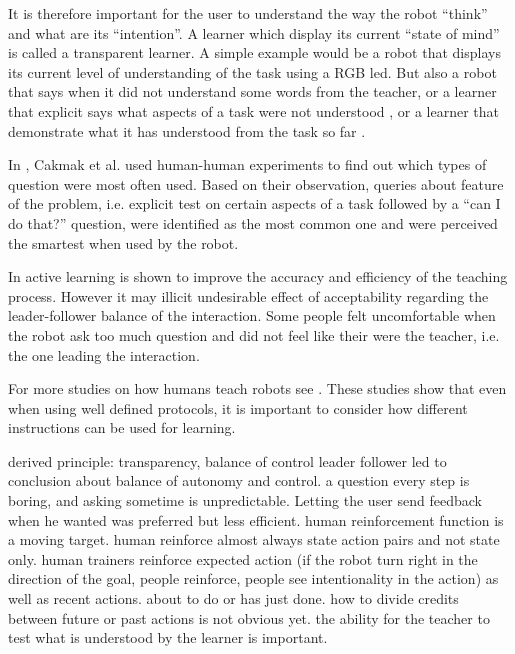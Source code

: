 It is therefore important for the user to understand the way the robot ``think'' and what are its ``intention''. A learner which display its current ``state of mind'' is called a transparent learner. A simple example would be a robot that displays its current level of understanding of the task using a RGB led. But also a robot that says when it did not understand some words from the teacher, or a learner that explicit says what aspects of a task were not understood \cite{chao2010transparent}, or a learner that demonstrate what it has understood from the task so far \cite{cakmak2012designing}. 


In \cite{cakmak2012designing}, Cakmak et al. used human-human experiments to find out which types of question were most often used. Based on their observation, queries about feature of the problem, i.e. explicit test on certain aspects of a task followed by a ``can I do that?'' question, were identified as the most common one and were perceived the smartest when used by the robot. 

In \cite{chao2010transparent} active learning is shown to improve the accuracy and efficiency of the teaching process. However it may illicit undesirable effect of acceptability regarding the leader-follower balance of the interaction. Some people felt uncomfortable when the robot ask too much question and did not feel like their were the teacher, i.e. the one leading the interaction.


For more studies on how humans teach robots see \cite{thomaz2009learning,kaochar2011towards,knox2012humans}. These studies show that even when using well defined protocols, it is important to consider how different instructions can be used for learning. 

derived principle: \cite{thomaz2008teachable} 
transparency, balance of control leader follower
\cite{cakmak2010designing} led to conclusion about balance of autonomy and control. a question every step is boring,  and asking sometime is unpredictable. Letting the user send feedback when he wanted was preferred but less efficient.
\cite{knox2009design} human reinforcement function is a moving target. human reinforce almost always state action pairs and not state only. human trainers reinforce expected action (if the robot turn right in the direction of the goal, people reinforce, people see intentionality in the action) as well as recent actions. about to do or has just done. how to divide credits between future or past actions is not obvious yet.
\cite{kaochar2011towards} the ability for the teacher to test what is understood by the learner is important.

